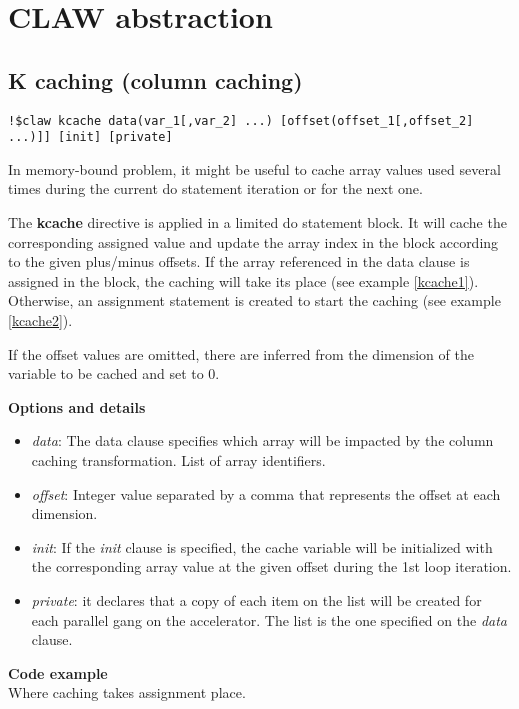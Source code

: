 \section{CLAW abstraction}

\subsection{K caching (column caching)}
\begin{lstlisting}
!$claw kcache data(var_1[,var_2] ...) [offset(offset_1[,offset_2] ...)]] [init] [private]
\end{lstlisting}

In memory-bound problem, it might be useful to cache array values used several times during the current do statement iteration or for the next one.

The \textbf{kcache} directive is applied in a limited do statement block. It will cache the corresponding assigned value and update
the array index in the block according to the given plus/minus offsets. If the array referenced in the data clause is assigned in the block, 
the caching will take its place (see example \ref{kcache1}). Otherwise, an assignment statement is created to start the caching (see example \ref{kcache2}). 

If the offset values are omitted, there are inferred from the dimension of the variable to be cached and set to 0.

\textbf{Options and details}
\begin{itemize}
\item \textit{data}: The data clause specifies which array will be impacted by the column caching transformation. List of array identifiers. 
\item \textit{offset}: Integer value separated by a comma that represents the offset at each dimension. 
\item \textit{init}: If the \textit{init} clause is specified, the cache variable will be initialized with the corresponding array value at the given offset during the 1st loop iteration. 
\item \textit{private}: it declares that a copy of each item on the list will be created
for each parallel gang on the accelerator. The list is the one specified on
the \textit{data} clause.
\end{itemize}

\textbf{Code example}\\
\label{kcache1}
Where caching takes assignment place. 

